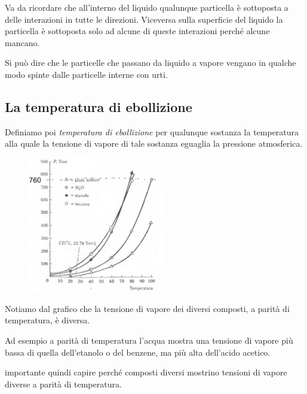 \vspace{0.4cm}Va da ricordare che all'interno del liquido qualunque particella è sottoposta a delle interazioni in tutte le direzioni. Viceversa sulla superficie del liquido la particella è sottoposta solo ad alcune di queste interazioni perché alcune mancano.

Si può dire che le particelle che passano da liquido a vapore vengano in qualche modo spinte dalle particelle interne con urti.

\subsection{La temperatura di ebollizione}
\vspace{0.2cm}Definiamo poi \textit{temperatura di ebollizione} per qualunque sostanza la temperatura alla quale la tensione di vapore di tale sostanza eguaglia la pressione atmosferica.

\hspace{0.5cm}\begin{minipage}{0.5 \textwidth}
    \begin{figure}[H]
        \includegraphics[width=6cm]{immagini/tensioni_di_vapore.png}
    \end{figure}
\end{minipage}
\begin{minipage}{0.4 \textwidth}
\vspace{0.5cm}Notiamo dal grafico che la tensione di vapore dei diversi composti, a parità di temperatura, è diversa.

\vspace{0.2cm}Ad esempio a parità di temperatura l'acqua mostra una tensione di vapore più bassa di quella dell'etanolo o del benzene, ma più alta dell'acido acetico.
\end{minipage}

\E importante quindi capire perché composti diversi mostrino tensioni di vapore diverse a parità di temperatura.

